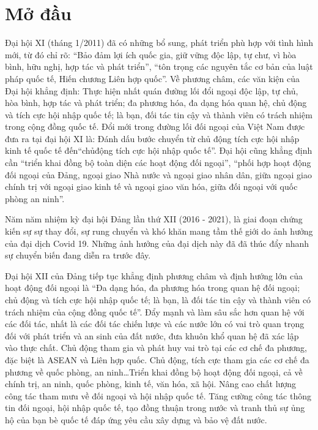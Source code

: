 \documentclass[12pt]{article}
\begin{document}
\begin{titlepage}
    \tableofcontents
\end{titlepage}
\setcounter{page}{1}
\section{Mở đầu}
Đại hội XI (tháng 1/2011) đã có những bổ sung, phát triển phù hợp với tình
hình mới, từ đó chỉ rõ: ``Bảo đảm lợi ích quốc gia, giữ vững độc lập, tự chư, vì
hòa bình, hữu nghị, hợp tác và phát triển'', ``tôn trọng các nguyên tắc cơ bản
của luật pháp quốc tế, Hiến chương Liên hợp quốc''. Về phương châm, các văn kiện
của Đại hội khẳng định: Thực hiện nhất quán đường lối đổi ngoại độc lập, tự chủ,
hòa bình, hợp tác và phát triển; đa phương hóa, đa dạng hóa quan hệ, chủ động và
tích cực hội nhập quốc tế; là bạn, đối tác tin cậy và thành viên có trách nhiệm
trong cộng đồng quốc tế. Đổi mới trong đường lối đối ngoại của Việt Nam được đưa
ra tại đại hội XI là: Đánh dấu bước chuyển từ chủ động tích cực hội nhập kinh tế
quốc tế đến``chủđộng tích cực hội nhập quốc tế''. Đại hội cũng khẳng định cần
``triển khai đồng bộ toàn diện các hoạt động đối ngoại'', ``phối hợp hoạt động
đối ngoại của Đảng, ngoại giao Nhà nước và ngoại giao nhân dân, giữa ngoại giao
chính trị với ngoại giao kinh tế và ngoại giao văn hóa, giữa đối ngoại với quốc
phòng an ninh''.

Năm năm nhiệm kỳ đại hội Đảng lần thứ XII (2016 - 2021), là giai
đoạn chứng kiến sự sự thay đổi, sự rung chuyển và khó khăn mang tầm thế giới do
ảnh hưởng của đại dịch Covid 19. Những ảnh hưởng của đại dịch này đã đã thúc đẩy nhanh sự
chuyển biến đang diễn ra trước đây.

Đại hội XII của Đảng tiếp tục khẳng định
phương châm và định hướng lớn của hoạt động đối ngoại là ``Đa dạng hóa, đa phương
hóa trong quan hệ đối ngoại; chủ động và tích cực hội nhập quốc tế; là bạn, là
đối tác tin cậy và thành viên có trách nhiệm của cộng đồng quốc tế''. Đẩy mạnh và
làm sâu sắc hơn quan hệ với các đối tác, nhất là các đối tác chiến lược và các
nước lớn có vai trò quan trọng đối với phát triển và an sinh của đất nước, đưa
khuôn khổ quan hệ đã xác lập vào thực chất. Chủ động tham gia và phát huy vai trò
tại các cơ chế đa phương, đặc biệt là ASEAN và Liên hợp quốc. Chủ động, tích cực
tham gia các cơ chế đa phương về quốc phòng, an ninh\ldots Triển khai đồng bộ hoạt
động đối ngoại, cả về chính trị, an ninh, quốc phòng, kinh tế, văn hóa, xã hội.
Nâng cao chất lượng công tác tham mưu về đối ngoại và hội nhập quốc tế. Tăng
cường công tác thông tin đối ngoại, hội nhập quốc tế, tạo đồng thuận trong nước
và tranh thủ sự ủng hộ của bạn bè quốc tế đáp ứng yêu cầu xây dựng và bảo vệ đất
nước.
\end{document}
